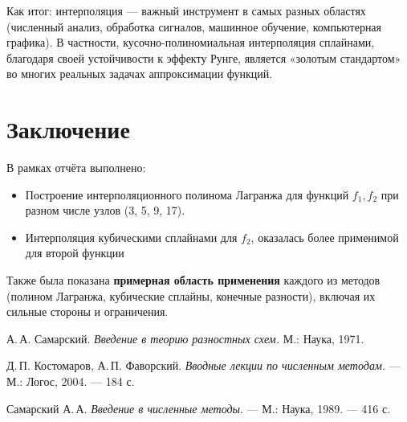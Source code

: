 \documentclass[a4paper, fleqn]{report}
\begin{document}
\noindent Как итог: интерполяция --- важный инструмент в самых разных областях (численный анализ, обработка сигналов, машинное обучение, компьютерная графика). В частности, кусочно-полиномиальная интерполяция сплайнами, благодаря своей устойчивости к эффекту Рунге, является «золотым стандартом» во многих реальных задачах аппроксимации функций.

\bigskip

\chapter*{Заключение}

В рамках отчёта выполнено:
\begin{itemize}
    \item Построение интерполяционного полинома Лагранжа для функций \(f_1, f_2\) при разном числе узлов (3, 5, 9, 17).
    \item Интерполяция кубическими сплайнами для \(f_2\), оказалась более применимой для второй функции

\end{itemize}

\vspace{10pt}

\noindent Также была показана \textbf{примерная область применения} каждого из методов (полином Лагранжа, кубические сплайны, конечные разности), включая их сильные стороны и ограничения.

\begin{thebibliography}{9}
\renewcommand{\bibname}{Литература}
А.\,А. Самарский. \textit{Введение в теорию разностных схем.} М.: Наука, 1971.

Д.\,П. Костомаров, А.\,П. Фаворский. \textit{Вводные лекции по численным методам.} — М.: Логос, 2004. — 184 с.

Самарский А.\,А. \textit{Введение в численные методы}. — М.: Наука, 1989. — 416 с.

\end{thebibliography}
\end{document}
